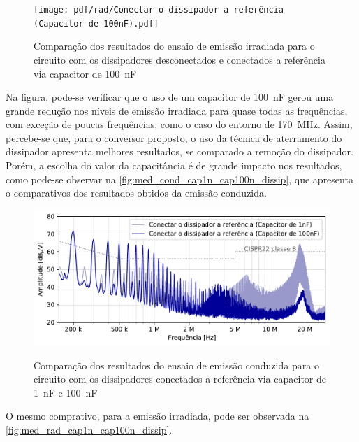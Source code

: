     \begin{figure}[H]
    	\centering
    	\caption{Comparação dos resultados do ensaio de emissão irradiada para o circuito com os dissipadores desconectados e conectados a referência via capacitor de \SI{100}{\nano\farad}}
    	\texttt{[image: pdf/rad/Conectar o dissipador a referência (Capacitor de 100nF).pdf]}
    	\label{fig:med_rad_cap100n_dissip}
    \end{figure}
    
    Na figura, pode-se verificar que o uso de um capacitor de \SI{100}{\nano\farad} gerou uma grande redução nos níveis de emissão irradiada para quase todas as frequências, com exceção de poucas frequências, como o caso do entorno de \SI{170}{\mega\hertz}. Assim, percebe-se que, para o conversor proposto, o uso da técnica de aterramento do dissipador apresenta melhores resultados, se comparado a remoção do dissipador. Porém, a escolha do valor da capacitância é de grande impacto nos resultados, como pode-se observar na \autoref{fig:med_cond_cap1n_cap100n_dissip}, que apresenta o comparativos dos resultados obtidos da emissão conduzida.
    
    \begin{figure}[H]
    	\centering
    	\caption{Comparação dos resultados do ensaio de emissão conduzida para o circuito com os dissipadores conectados a referência via capacitor de \SI{1}{\nano\farad} e \SI{100}{\nano\farad}}
    	\includegraphics[scale=.85]{pdf/cond/cond-Conectar o dissipador a referência (Capacitor de 1nF)-Conectar o dissipador a referência (Capacitor de 100nF).pdf}
    	\label{fig:med_cond_cap1n_cap100n_dissip}
    \end{figure}
    
    O mesmo comprativo, para a emissão irradiada, pode ser observada na \autoref{fig:med_rad_cap1n_cap100n_dissip}.
    
